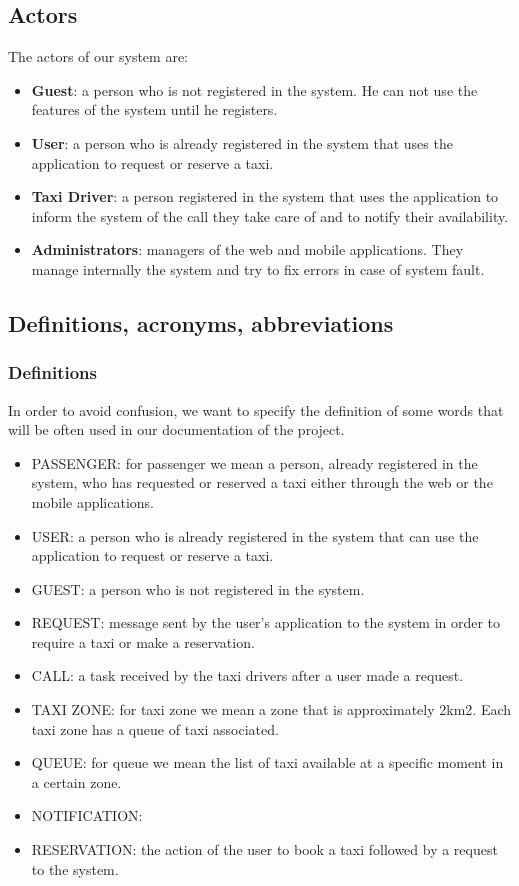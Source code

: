 \documentclass{article}
\begin{document}
	\subsection{Actors}
    	The actors of our system are:
    	\begin{itemize}
    	    \item \textbf{Guest}: a person who is not registered in the system. He can not use the features of the system until he registers. 
    		\item \textbf{User}: a person who is already registered in the system that uses the application to request or reserve a taxi.
    		\item \textbf{Taxi Driver}: a person registered in the system that uses the application to inform the system of the call they take care of and to notify their availability.
    		\item \textbf{Administrators}: managers of the web and mobile applications. They manage internally the system and try to fix errors in case of system fault.
    	\end{itemize}
	
	\subsection{Definitions, acronyms, abbreviations}
	    \subsubsection{Definitions}
        	In order to avoid confusion, we want to specify the definition of some words that will be often used in our documentation of the project. 
        	\begin{itemize}
        		\item PASSENGER: for passenger we mean a person, already registered in the system, who has requested or reserved a taxi either through the web or the mobile applications.
        		\item USER: a person who is already registered in the system that can use the application to request or reserve a taxi.
        		\item GUEST:  a person who is not registered in the system.
        		\item REQUEST: message sent by the user's application to the system in order to require a taxi or make a reservation.
        		\item CALL: a task received by the taxi drivers after a user made a request.
        		\item TAXI ZONE: for taxi zone we mean a zone that is approximately 2km2. Each taxi zone has a queue of taxi associated. 
        	    \item QUEUE: for queue we mean the list of taxi available at a specific moment in a certain zone.
        		\item NOTIFICATION: 
        		\item RESERVATION: the action of the user to book a taxi followed by a request to the system.
        	\end{itemize}
    	
\end{document}
